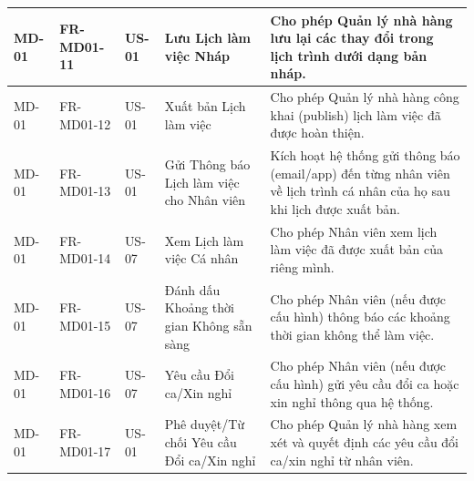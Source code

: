 \begin{longtable}{|m{2cm}|m{2.5cm}|m{2cm}|m{4cm}|m{4.5cm}|}
    \hline
    MD-01 & FR-MD01-11 & US-01 & Lưu Lịch làm việc Nháp & Cho phép Quản lý nhà hàng lưu lại các thay đổi trong lịch trình dưới dạng bản nháp. \\
    \hline
    MD-01 & FR-MD01-12 & US-01 & Xuất bản Lịch làm việc & Cho phép Quản lý nhà hàng công khai (publish) lịch làm việc đã được hoàn thiện. \\
    \hline
    MD-01 & FR-MD01-13 & US-01 & Gửi Thông báo Lịch làm việc cho Nhân viên & Kích hoạt hệ thống gửi thông báo (email/app) đến từng nhân viên về lịch trình cá nhân của họ sau khi lịch được xuất bản. \\
    \hline
    MD-01 & FR-MD01-14 & US-07 & Xem Lịch làm việc Cá nhân & Cho phép Nhân viên xem lịch làm việc đã được xuất bản của riêng mình. \\
    \hline
    MD-01 & FR-MD01-15 & US-07 & Đánh dấu Khoảng thời gian Không sẵn sàng & Cho phép Nhân viên (nếu được cấu hình) thông báo các khoảng thời gian không thể làm việc. \\
    \hline
    MD-01 & FR-MD01-16 & US-07 & Yêu cầu Đổi ca/Xin nghỉ & Cho phép Nhân viên (nếu được cấu hình) gửi yêu cầu đổi ca hoặc xin nghỉ thông qua hệ thống. \\
    \hline
    MD-01 & FR-MD01-17 & US-01 & Phê duyệt/Từ chối Yêu cầu Đổi ca/Xin nghỉ & Cho phép Quản lý nhà hàng xem xét và quyết định các yêu cầu đổi ca/xin nghỉ từ nhân viên. \\
    \hline
    
    \end{longtable}



